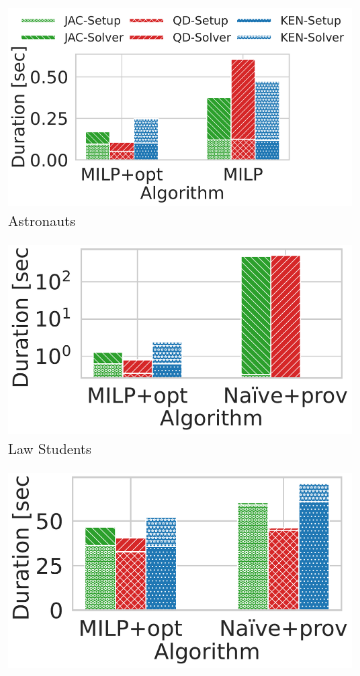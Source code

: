 \begin{figure}[t]
    \begin{subfigure}{.35\textwidth}
      \centering
      \includegraphics[width=.87\linewidth]{figures/astr_method.pdf}
      \hspace{-0.6cm}
      \caption{Astronauts}
      \label{fig:r1}
    \end{subfigure}%
    \begin{subfigure}{.35\textwidth}
      \centering
      \includegraphics[width=.75\linewidth]{figures/law_method.pdf}
      \caption{Law Students}
      \label{fig:law_method}
    \end{subfigure}
    \begin{subfigure}{.35\textwidth}
      \centering
      \includegraphics[width=.75\linewidth]{figures/meps_method.pdf}

\end{subfigure}
\end{figure}
